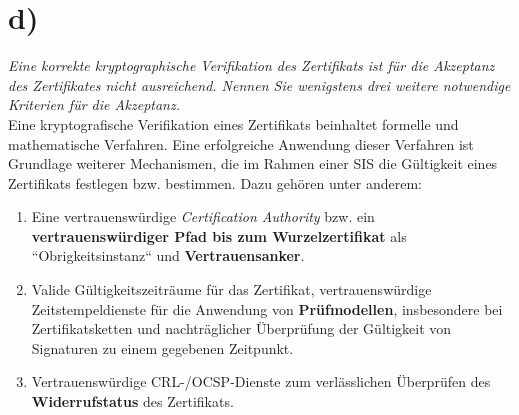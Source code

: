 \section{d)}

\textit{Eine korrekte kryptographische Verifikation des Zertifikats ist für die Akzeptanz
des Zertifikates nicht ausreichend. Nennen Sie wenigstens drei weitere notwendige Kriterien für die Akzeptanz.}\\

\noindent
Eine kryptografische Verifikation eines Zertifikats beinhaltet formelle und mathematische Verfahren.
Eine erfolgreiche Anwendung dieser Verfahren ist Grundlage weiterer Mechanismen, die im Rahmen einer SIS die Gültigkeit eines Zertifikats festlegen bzw. bestimmen.
Dazu gehören unter anderem:

\begin{enumerate}
    \itemsep0.5em
    \item Eine vertrauenswürdige \textit{Certification Authority} bzw. ein \textbf{vertrauenswürdiger Pfad bis zum Wurzelzertifikat} als ``Obrigkeitsinstanz`` und \textbf{Vertrauensanker}.
    \item Valide Gültigkeitszeiträume für das Zertifikat, vertrauenswürdige Zeitstempeldienste für die Anwendung von \textbf{Prüfmodellen}, insbesondere bei Zertifikatsketten und nachträglicher Überprüfung der Gültigkeit von Signaturen zu einem gegebenen Zeitpunkt.
    \item Vertrauenswürdige CRL-/OCSP-Dienste zum verlässlichen Überprüfen des \textbf{Widerrufstatus} des Zertifikats.
\end{enumerate}
